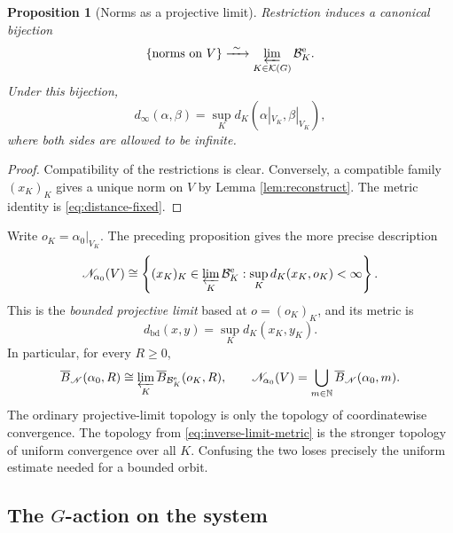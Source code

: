 \documentclass[12pt]{article}
\newtheorem{proposition}[theorem]{Proposition}
\theoremstyle{definition}
\theoremstyle{remark}
\newcommand{\N}{\mathbb N}
\newcommand{\Norm}{\mathscr N}
\newcommand{\dinf}{d_{\infty}}
\newcommand{\Building}{\mathcal B}
\begin{document}
\begin{proposition}[Norms as a projective limit]
\label{prop:all-norms-limit}
Restriction induces a canonical bijection
\[
  \{\text{norms on }V\}
   \xrightarrow{\ \sim\ }
  \varprojlim_{K\in\mathcal K(G)}\Building_K^{\mathrm e}.
\]
Under this bijection,
\[
  \dinf(\alpha,\beta)
   =\sup_K d_K(\alpha|_{V_K},\beta|_{V_K}),
\]
where both sides are allowed to be infinite.
\end{proposition}

\begin{proof}
Compatibility of the restrictions is clear.  Conversely, a compatible
family $(x_K)_K$ gives a unique norm on $V$ by Lemma
\ref{lem:reconstruct}.  The metric identity is
\eqref{eq:distance-fixed}.
\end{proof}

Write $o_K=\alpha_0|_{V_K}$.  The preceding proposition gives the more
precise description
\begin{equation}\label{eq:bounded-projective-limit}
 \Norm_{\alpha_0}(V)
 \cong
 \left\{(x_K)_K\in
   \varprojlim_K\Building_K^{\mathrm e}:
   \sup_K d_K(x_K,o_K)<\infty\right\}.
\end{equation}
This is the \emph{bounded projective limit} based at
$o=(o_K)_K$, and its metric is
\begin{equation}\label{eq:inverse-limit-metric}
 d_{\mathrm{bd}}(x,y)=\sup_Kd_K(x_K,y_K).
\end{equation}
In particular, for every $R\geq0$,
\begin{equation}\label{eq:fixed-radius-limit}
 \overline B_{\Norm}(\alpha_0,R)
 \cong
 \varprojlim_K\overline B_{\Building_K^{\mathrm e}}(o_K,R),
 \qquad
 \Norm_{\alpha_0}(V)
 =\bigcup_{m\in\N}\overline B_{\Norm}(\alpha_0,m).
\end{equation}
The ordinary projective-limit topology is only the topology of
coordinatewise convergence.  The topology from
\eqref{eq:inverse-limit-metric} is the stronger topology of uniform
convergence over all $K$.  Confusing the two loses precisely the
uniform estimate needed for a bounded orbit.

\subsection{\texorpdfstring{The $G$-action on the system}{The G-action on the system}}
\end{document}
